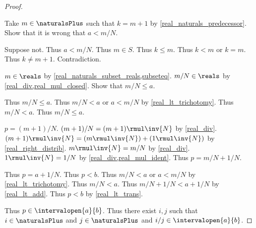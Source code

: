 \begin{proof}
\begin{subproof}
\begin{byCase}
\begin{byCase}
            \end{byCase}
            Take $m\in\naturalsPlus$ such that $k = m + 1$ by \cref{real_naturals_predecessor}.
            Show that it is wrong that $a < m / N$.
            \begin{subproof}
                Suppose not.
                Thus $a < m / N$.
                Thus $m\in S$.
                Thus $k \leq m$.
                Thus $k < m$ or $k = m$.
                Thus $k \neq m + 1$.
                Contradiction.
            \end{subproof}
            $m\in\reals$ by \cref{real_naturals_subset_reals,subseteq}.
            $m / N\in\reals$ by \cref{real_div,real_mul_closed}.
            Show that $m / N \leq a$.
            \begin{subproof}
                \begin{byCase}
                    Thus $m / N \leq a$.
                    Thus $m / N < a$ or $a < m / N$ by \cref{real_lt_trichotomy}.
                    Thus $m / N < a$.
                    Thus $m / N \leq a$.
                \end{byCase}
            \end{subproof}
            $p = (m + 1) / N$.
            $(m + 1) / N = (m + 1) \rmul \inv{N}$ by \cref{real_div}.
            $(m + 1) \rmul \inv{N} = (m \rmul \inv{N}) + (1 \rmul \inv{N})$ by \cref{real_right_distrib}.
            $m \rmul \inv{N} = m / N$ by \cref{real_div}.
            $1 \rmul \inv{N} = 1 / N$ by \cref{real_div,real_mul_ident}.
            Thus $p = m / N + 1 / N$.
            \begin{byCase}
                Thus $p = a + 1 / N$.
                Thus $p < b$.
                Thus $m / N < a$ or $a < m / N$ by \cref{real_lt_trichotomy}.
                Thus $m / N < a$.
                Thus $m / N + 1 / N < a + 1 / N$ by \cref{real_lt_add}.
                Thus $p < b$ by \cref{real_lt_trans}.
            \end{byCase}
        \end{byCase}
    \end{subproof}
    Thus $p\in\intervalopen{a}{b}$.
    Thus there exist $i, j$ such that $i\in\naturalsPlus$ and $j\in\naturalsPlus$ and $i / j\in\intervalopen{a}{b}$.
\end{proof}

